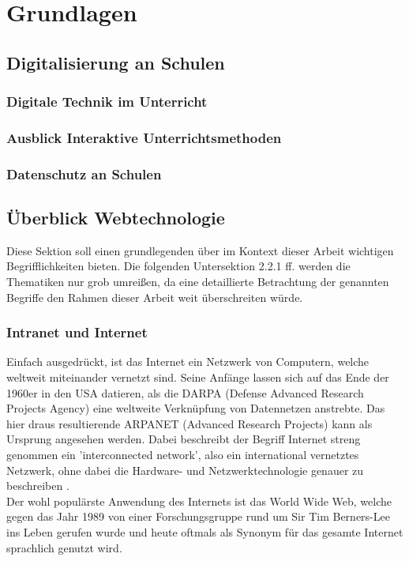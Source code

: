 \section{Grundlagen}\label{sec:grundlagen}
\subsection{Digitalisierung an Schulen}
\subsubsection{Digitale Technik im Unterricht}\label{sec:technikunterricht}
\subsubsection{Ausblick Interaktive Unterrichtsmethoden}\label{sec:interaktiveunterr}
\subsubsection{Datenschutz an Schulen}\label{sec:datenschutz}

\subsection{Überblick Webtechnologie}\label{sec:webbasedsoftware}
Diese Sektion soll einen grundlegenden über im Kontext dieser Arbeit wichtigen Begrifflichkeiten bieten. Die folgenden Untersektion 2.2.1 ff. werden die Thematiken nur grob umreißen, da eine detaillierte Betrachtung der genannten Begriffe den Rahmen dieser Arbeit weit überschreiten würde. 

\subsubsection{Intranet und Internet}\label{sec:intranetundinternet}
Einfach ausgedrückt, ist das Internet ein Netzwerk von Computern, welche weltweit miteinander vernetzt sind. Seine Anfänge lassen sich auf das Ende der 1960er in den USA datieren, als die DARPA (Defense Advanced Research Projects Agency) eine weltweite Verknüpfung von Datennetzen anstrebte. Das hier draus resultierende ARPANET (Advanced Research Projects) kann als Ursprung angesehen werden. Dabei beschreibt der Begriff Internet streng genommen ein 'interconnected network', also ein international vernetztes Netzwerk, ohne dabei die Hardware- und Netzwerktechnologie genauer zu beschreiben \cite{safran2011webtechnologien:article}.  \\ 
Der wohl populärste Anwendung des Internets ist das World Wide Web, welche gegen das Jahr 1989 von einer Forschungsgruppe rund um Sir Tim Berners-Lee ins Leben gerufen wurde und heute oftmals als Synonym für das gesamte Internet sprachlich genutzt wird. \\ 


